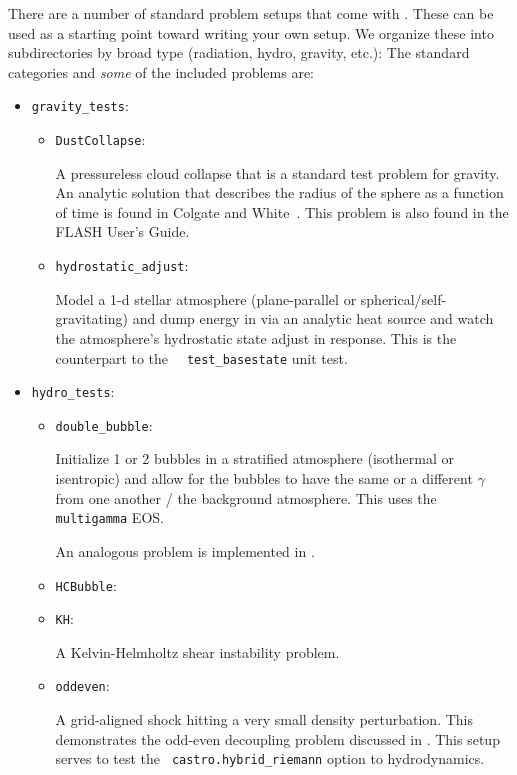 There are a number of standard problem setups that come with \castro.
These can be used as a starting point toward writing your own setup.
We organize these into subdirectories by broad type (radiation, hydro,
gravity, etc.): The standard categories and {\em some} of the included
problems are:
\begin{itemize}
\item {\tt gravity\_tests}:

  \begin{itemize}
  \item {\tt DustCollapse}:

    A pressureless cloud collapse that is a standard test problem for
    gravity.  An analytic solution that describes the radius of the
    sphere as a function of time is found in Colgate and
    White~\cite{colgwhite}.  This problem is also found in the FLASH
    User's Guide.
    
  \item {\tt hydrostatic\_adjust}:

    Model a 1-d stellar atmosphere (plane-parallel or
    spherical/self-gravitating) and dump energy in via an analytic
    heat source and watch the atmosphere's hydrostatic state adjust in
    response.  This is the counterpart to the \maestro\ {\tt
      test\_basestate} unit test.

  \end{itemize}


\item {\tt hydro\_tests}:

  \begin{itemize}
  \item {\tt double\_bubble}:

    Initialize 1 or 2 bubbles in a stratified atmosphere (isothermal
    or isentropic) and allow for the bubbles to have the same or a
    different $\gamma$ from one another / the background atmosphere.
    This uses the {\tt multigamma} EOS.

    An analogous problem is implemented in \maestro.
    
  \item {\tt HCBubble}:
  
  \item {\tt KH}:

    A Kelvin-Helmholtz shear instability problem.
  
  \item {\tt oddeven}:

    A grid-aligned shock hitting a very small density perturbation.
    This demonstrates the odd-even decoupling problem discussed in
    \cite{quirk1997}.  This setup serves to test the {\tt
      castro.hybrid\_riemann} option to hydrodynamics.
  

\end{itemize}
\end{itemize}
